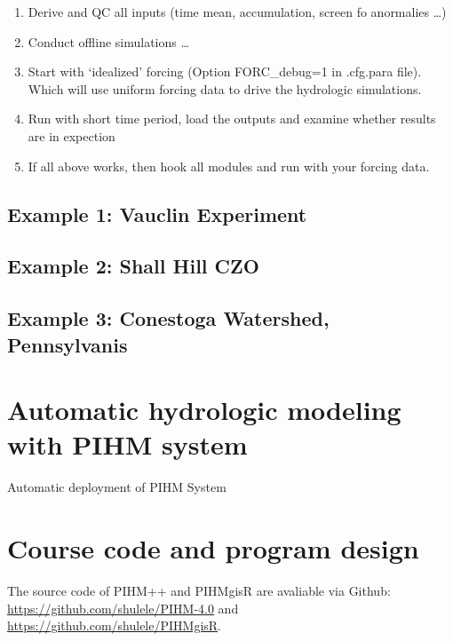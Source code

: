 \documentclass[]{scrbook}
\providecommand{\tightlist}{%
  \setlength{\itemsep}{0pt}\setlength{\parskip}{0pt}}
\begin{document}
\begin{enumerate}
\def\labelenumi{\arabic{enumi}.}
\tightlist
\item
  Derive and QC all inputs (time mean, accumulation, screen fo
  anormalies \ldots{})
\item
  Conduct offline simulations \ldots{}
\item
  Start with `idealized' forcing (Option FORC\_debug=1 in .cfg.para
  file). Which will use uniform forcing data to drive the hydrologic
  simulations.
\item
  Run with short time period, load the outputs and examine whether
  results are in expection
\item
  If all above works, then hook all modules and run with your forcing
  data.
\end{enumerate}

\section{Example 1: Vauclin
Experiment}\label{example-1-vauclin-experiment}

\section{Example 2: Shall Hill CZO}\label{example-2-shall-hill-czo}

\section{Example 3: Conestoga Watershed,
Pennsylvanis}\label{example-3-conestoga-watershed-pennsylvanis}

\chapter{Automatic hydrologic modeling with PIHM
system}\label{automatic-hydrologic-modeling-with-pihm-system}

Automatic deployment of PIHM System

\chapter{Course code and program
design}\label{course-code-and-program-design}

The source code of PIHM++ and PIHMgisR are avaliable via Github:
\url{https://github.com/shulele/PIHM-4.0} and
\url{https://github.com/shulele/PIHMgisR}.


\end{document}
